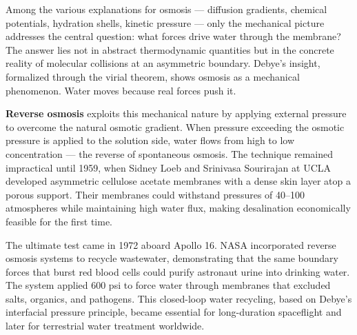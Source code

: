 Among the various explanations for osmosis — diffusion gradients, chemical potentials, hydration shells, kinetic pressure — only the mechanical picture addresses the central question: what forces drive water through the membrane? The answer lies not in abstract thermodynamic quantities but in the concrete reality of molecular collisions at an asymmetric boundary. Debye's insight, formalized through the virial theorem, shows osmosis as a mechanical phenomenon. Water moves because real forces push it.

\textbf{Reverse osmosis} exploits this mechanical nature by applying external pressure to overcome the natural osmotic gradient. When pressure exceeding the osmotic pressure is applied to the solution side, water flows from high to low concentration — the reverse of spontaneous osmosis. The technique remained impractical until 1959, when Sidney Loeb and Srinivasa Sourirajan at UCLA developed asymmetric cellulose acetate membranes with a dense skin layer atop a porous support. Their membranes could withstand pressures of 40–100 atmospheres while maintaining high water flux, making desalination economically feasible for the first time.

The ultimate test came in 1972 aboard Apollo 16. NASA incorporated reverse osmosis systems to recycle wastewater, demonstrating that the same boundary forces that burst red blood cells could purify astronaut urine into drinking water. The system applied 600 psi to force water through membranes that excluded salts, organics, and pathogens. This closed-loop water recycling, based on Debye's interfacial pressure principle, became essential for long-duration spaceflight and later for terrestrial water treatment worldwide.
